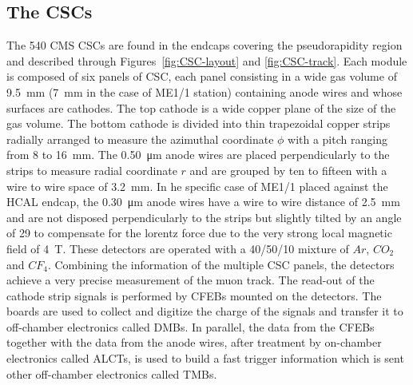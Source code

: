 	\subsection{The \acl{CSC}s}
	\label{chapt3:ssec:CSCs}
	
	The 540 CMS CSCs are found in the endcaps covering the pseudorapidity region  and described through Figures~\ref{fig:CSC-layout} and \ref{fig:CSC-track}. Each module is composed of six panels of CSC, each panel consisting in a wide gas volume of \SI{9.5}{mm} (\SI{7}{mm} in the case of ME1/1 station) containing anode wires and whose surfaces are cathodes. The top cathode is a wide copper plane of the size of the gas volume. The bottom cathode is divided into thin trapezoidal copper strips radially arranged to measure the azimuthal coordinate $\phi$ with a pitch ranging from 8 to \SI{16}{mm}. The \SI{0.50}{\micro m} anode wires are placed perpendicularly to the strips to measure radial coordinate $r$ and are grouped by ten to fifteen with a wire to wire space of \SI{3.2}{mm}. In he specific case of ME1/1 placed against the HCAL endcap, the \SI{0.30}{\micro m} anode wires have a wire to wire distance of \SI{2.5}{mm} and are not disposed perpendicularly to the strips but slightly tilted by an angle of \SI{29}{\deg} to compensate for the lorentz force due to the very strong local magnetic field of \SI{4}{T}. These detectors are operated with a 40/50/10 mixture of $Ar$, $CO_2$ and $CF_4$. Combining the information of the multiple CSC panels, the detectors achieve a very precise measurement of the muon track. The read-out of the cathode strip signals is performed by \acf{CFEBs} mounted on the detectors. The boards are used to collect and digitize the charge of the signals and transfer it to off-chamber electronics called \acf{DMBs}. In parallel, the data from the CFEBs together with the data from the anode wires, after treatment by on-chamber electronics called \acf{ALCTs}, is used to build a fast trigger information which is sent other off-chamber electronics called \acf{TMBs}.
	
